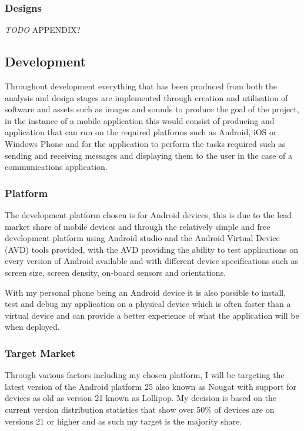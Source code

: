 \subsubsection{Designs}\label{designs}

\emph{TODO} APPENDIX?

\subsection{Development}\label{development}

Throughout development everything that has been produced from both the
analysis and design stages are implemented through creation and
utilisation of software and assets such as images and sounds to produce
the goal of the project, in the instance of a mobile application this
would consist of producing and application that can run on the required
platforms such as Android, iOS or Windows Phone and for the application
to perform the tasks required such as sending and receiving messages and
displaying them to the user in the case of a communications application.

\subsubsection{Platform}\label{platform}

The development platform chosen is for Android devices, this is due to
the lead market share of mobile devices and through the relatively
simple and free development platform using Android studio and the
Android Virtual Device (AVD) tools provided, with the AVD providing the
ability to test applications on every version of Android available and
with different device specifications such as screen size, screen
density, on-board sensors and orientations.

With my personal phone being an Android device it is also possible to
install, test and debug my application on a physical device which is
often faster than a virtual device and can provide a better experience
of what the application will be when deployed.

\subsubsection{Target Market}\label{target-market}

Through various factors including my chosen platform, I will be
targeting the latest version of the Android platform 25 also known as
Nougat with support for devices as old as version 21 known as Lollipop.
My decision is based on the current version distribution statistics that
show over 50\% of devices are on versions 21 or higher and as such my
target is the majority share.

